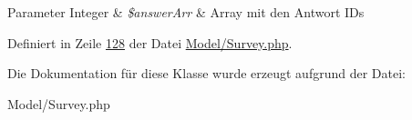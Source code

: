 \begin{DoxyParams}[1]{Parameter}
Integer & {\em \$answer\-Arr} & Array mit den Antwort I\-Ds \\
\hline
\end{DoxyParams}


Definiert in Zeile \hyperlink{_model_2_survey_8php_source_l00128}{128} der Datei \hyperlink{_model_2_survey_8php_source}{Model/\-Survey.\-php}.




Die Dokumentation für diese Klasse wurde erzeugt aufgrund der Datei\-:\begin{DoxyCompactItemize}
\item 
Model/\-Survey.\-php\end{DoxyCompactItemize}
